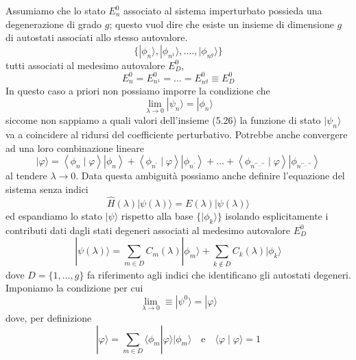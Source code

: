Assumiamo che lo stato $E_n^0$ associato al sistema imperturbato possieda una degenerazione di  grado $g$; questo vuol dire che esiste un insieme di dimensione $g$ di autostati associati allo stesso autovalore.
\begin{equation}
	 \{ |\phi_n \rangle, |\phi_{n^1} \rangle, ....,|\phi_{n^g} \rangle \} 
\end{equation}
tutti associati al medesimo autovalore $E^0_{D}$,
\begin{equation*}
	E_n^0 = E_{n^1}^0 = \ldots =E_{n^g}^0 \equiv E_{D}^0
\end{equation*}
In questo caso a priori non possiamo imporre la condizione che 
\begin{equation}
	\lim_{\lambda \to 0 } |\psi_n \rangle = |\phi_n \rangle 
\end{equation}
siccome non sappiamo a quali valori dell'insieme (5.26) la funzione di stato $|\psi_n \rangle $ va a coincidere al ridursi del coefficiente perturbativo. Potrebbe anche convergere ad una loro combinazione lineare 
\begin{equation}
|\varphi\rangle=\left\langle\phi_n \mid \varphi\right\rangle\left|\phi_n\right\rangle+\left\langle\phi_{n^{\prime}} \mid \varphi\right\rangle\left|\phi_{n^{\prime}}\right\rangle+\ldots+\left\langle\phi_{n^{\prime \prime \ldots \prime \prime}}\mid \varphi\right\rangle\left|\phi_{n^{\prime \prime\ldots \prime \prime}}\right\rangle
\end{equation}
al tendere $\lambda \to 0 $. 
Data questa ambiguit\`a possiamo anche definire l'equazione del sistema senza indici
\begin{equation*}
	\hat{H}(\lambda)|\psi(\lambda) \rangle = E(\lambda)|\psi(\lambda) \rangle
\end{equation*}
ed espandiamo lo stato $|\psi \rangle $ rispetto alla base $\{|\phi_k \rangle \}$ isolando esplicitamente i contributi dati dagli stati degeneri associati al medesimo autovalore $E_{D}^0$
\begin{equation}
	|\psi(\lambda) \rangle = \sum_{m \in D} C_{m}(\lambda)|\phi_m \rangle + \sum_{k \not \in D}C_k(\lambda)|\phi_k \rangle
\end{equation}
dove $D = \{1,\ldots,g \}$ fa riferimento agli indici che identificano gli autostati degeneri.
Imponiamo la condizione per cui 
\begin{equation}
\lim_{\lambda \to 0} \equiv |\psi^0 \rangle = |\varphi \rangle 	
\end{equation}
dove, per definizione
\begin{equation}
	|\varphi \rangle = \sum_{m \in D} \langle \phi_m | \varphi \rangle |\phi_m \rangle  \quad \text{e} \quad \langle \varphi \mid \varphi \rangle = 1
\end{equation}
